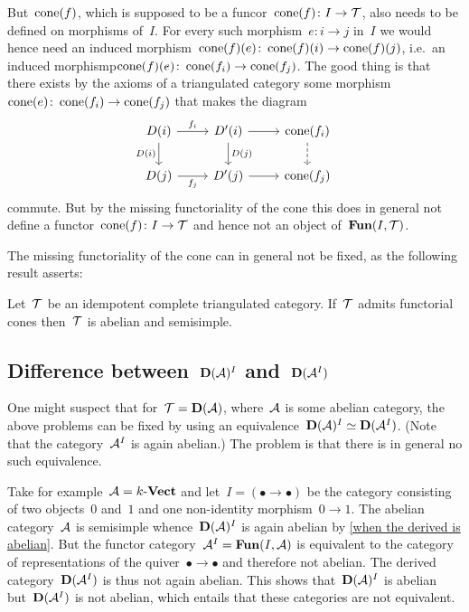 \documentclass[a4paper,10pt]{scrartcl}
\begin{document}
But~$\operatorname{cone}(f)$, which is supposed to be a funcor~$\operatorname{cone}(f) \colon I \to \mathcal{T}$, also needs to be defined on morphisms of~$I$.
For every such morphism~$e \colon i \to j$ in~$I$ we would hence need an induced morphism~$\operatorname{cone}(f)(e) \colon \operatorname{cone}(f)(i) \to \operatorname{cone}(f)(j)$, i.e.\ an induced morphismp$\operatorname{cone}(f)(e) \colon \operatorname{cone}(f_i) \to \operatorname{cone}(f_j)$.
The good thing is that there exists by the axioms of a triangulated category some morphism~$\operatorname{cone}(e) \colon \operatorname{cone}(f_i) \to \operatorname{cone}(f_j)$ that makes the diagram
\[
  \begin{tikzcd}
    D(i)
    \arrow{r}[above]{f_i}
    \arrow{d}[left]{D(i)}
    &
    D'(i)
    \arrow{d}[right]{D(j)}
    \arrow{r}
    &
    \cone(f_i)
    \arrow[dashed]{d}
    \\
    D(j)
    \arrow{r}[below]{f_j}
    &
    D'(j)
    \arrow{r}
    &
    \cone(f_j)
  \end{tikzcd}
\]
commute.
But by the missing functoriality of the cone this does in general not define a functor~$\operatorname{cone}(f) \colon I \to \mathcal{T}$ and hence not an object of~$\mathbf{Fun}(I, \mathcal{T})$.

The missing functoriality of the cone can in general not be fixed, as the following result asserts:

\begin{proposition}
  Let~$\mathcal{T}$ be an idempotent complete triangulated category.
  If~$\mathcal{T}$ admits functorial cones then~$\mathcal{T}$ is abelian and semisimple.
\end{proposition}



\subsection{Difference between~$\mathbf{D}(\mathcal{A})^I$ and~$\mathbf{D}(\mathcal{A}^I)$}

One might suspect that for~$\mathcal{T} = \mathbf{D}(\mathcal{A})$, where~$\mathcal{A}$ is some abelian category, the above problems can be fixed by using an equivalence~$\mathbf{D}(\mathcal{A})^I \simeq \mathbf{D}(\mathcal{A}^I)$.
(Note that the category~$\mathcal{A}^I$ is again abelian.)
The problem is that there is in general no such equivalence.

Take for example~$\mathcal{A} = k\text{-}\mathbf{Vect}$ and let~$I = (\bullet \to \bullet)$ be the category consisting of two objects~$0$ and~$1$ and one non-identity morphism~$0 \to 1$.
The abelian category~$\mathcal{A}$ is semisimple whence~$\mathbf{D}(\mathcal{A})^I$ is again abelian by \cref{when the derived is abelian}.
But the functor category~$\mathcal{A}^I = \mathbf{Fun}(I, \mathcal{A})$ is equivalent to the category of representations of the quiver~$\bullet \to \bullet$ and therefore not abelian.
The derived category~$\mathbf{D}(\mathcal{A}^I)$ is thus not again abelian.
This shows that~$\mathbf{D}(\mathcal{A})^I$ is abelian but~$\mathbf{D}(\mathcal{A}^I)$ is not abelian, which entails that these categories are not equivalent.
\end{document}
